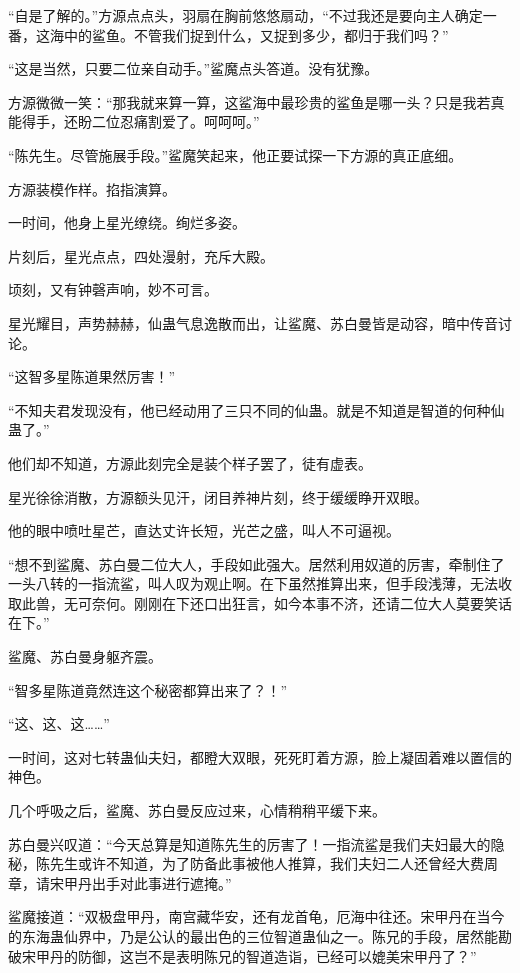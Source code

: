 \begin{this_body}
“自是了解的。”方源点点头，羽扇在胸前悠悠扇动，“不过我还是要向主人确定一番，这海中的鲨鱼。不管我们捉到什么，又捉到多少，都归于我们吗？”

“这是当然，只要二位亲自动手。”鲨魔点头答道。没有犹豫。

方源微微一笑：“那我就来算一算，这鲨海中最珍贵的鲨鱼是哪一头？只是我若真能得手，还盼二位忍痛割爱了。呵呵呵。”

“陈先生。尽管施展手段。”鲨魔笑起来，他正要试探一下方源的真正底细。

方源装模作样。掐指演算。

一时间，他身上星光缭绕。绚烂多姿。

片刻后，星光点点，四处漫射，充斥大殿。

顷刻，又有钟磬声响，妙不可言。

星光耀目，声势赫赫，仙蛊气息逸散而出，让鲨魔、苏白曼皆是动容，暗中传音讨论。

“这智多星陈道果然厉害！”

“不知夫君发现没有，他已经动用了三只不同的仙蛊。就是不知道是智道的何种仙蛊了。”

他们却不知道，方源此刻完全是装个样子罢了，徒有虚表。

星光徐徐消散，方源额头见汗，闭目养神片刻，终于缓缓睁开双眼。

他的眼中喷吐星芒，直达丈许长短，光芒之盛，叫人不可逼视。

“想不到鲨魔、苏白曼二位大人，手段如此强大。居然利用奴道的厉害，牵制住了一头八转的一指流鲨，叫人叹为观止啊。在下虽然推算出来，但手段浅薄，无法收取此兽，无可奈何。刚刚在下还口出狂言，如今本事不济，还请二位大人莫要笑话在下。”

鲨魔、苏白曼身躯齐震。

“智多星陈道竟然连这个秘密都算出来了？！”

“这、这、这……”

一时间，这对七转蛊仙夫妇，都瞪大双眼，死死盯着方源，脸上凝固着难以置信的神色。

几个呼吸之后，鲨魔、苏白曼反应过来，心情稍稍平缓下来。

苏白曼兴叹道：“今天总算是知道陈先生的厉害了！一指流鲨是我们夫妇最大的隐秘，陈先生或许不知道，为了防备此事被他人推算，我们夫妇二人还曾经大费周章，请宋甲丹出手对此事进行遮掩。”

鲨魔接道：“双极盘甲丹，南宫藏华安，还有龙首龟，厄海中往还。宋甲丹在当今的东海蛊仙界中，乃是公认的最出色的三位智道蛊仙之一。陈兄的手段，居然能勘破宋甲丹的防御，这岂不是表明陈兄的智道造诣，已经可以媲美宋甲丹了？”


\end{this_body}
